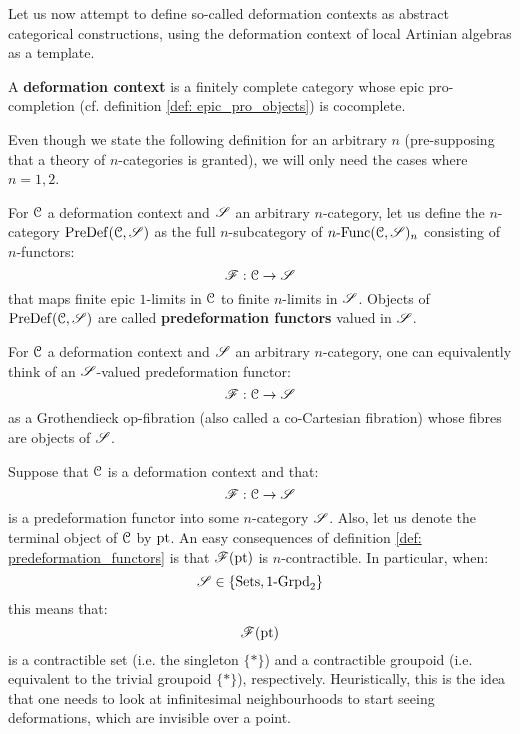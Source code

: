             Let us now attempt to define so-called deformation contexts as abstract categorical constructions, using the deformation context of local Artinian algebras as a template.
            \begin{definition} \label{def: deformation_context}
                A \textbf{deformation context} is a finitely complete category whose epic pro-completion (cf. definition \ref{def: epic_pro_objects}) is cocomplete. 
            \end{definition}
            Even though we state the following definition for an arbitrary $n$ (pre-supposing that a theory of $n$-categories is granted), we will only need the cases where $n = 1, 2$. 
            \begin{definition} \label{def: predeformation_functors}
                For $\mathcal{C}$ a deformation context and $\mathscr{S}$ an arbitrary $n$-category, let us define the $n$-category $\mathrm{Pre}\mathrm{Def}(\mathcal{C}, \mathscr{S})$ as the full $n$-subcategory of $n\text{-}\mathrm{Func}(\mathcal{C}, \mathscr{S})_n$ consisting of $n$-functors:
                    $$\mathscr{F}: \mathcal{C} \to \mathscr{S}$$
                that maps finite epic $1$-limits in $\mathcal{C}$ to finite $n$-limits in $\mathscr{S}$. Objects of $\mathrm{Pre}\mathrm{Def}(\mathcal{C}, \mathscr{S})$ are called \textbf{predeformation functors} valued in $\mathscr{S}$. 
            \end{definition}
            \begin{remark}
                For $\mathcal{C}$ a deformation context and $\mathscr{S}$ an arbitrary $n$-category, one can equivalently think of an $\mathscr{S}$-valued predeformation functor:
                    $$\mathscr{F}: \mathcal{C} \to \mathscr{S}$$
                as a Grothendieck op-fibration (also called a co-Cartesian fibration) whose fibres are objects of $\mathscr{S}$. 
            \end{remark}
            \begin{remark}
                Suppose that $\mathcal{C}$ is a deformation context and that:
                    $$\mathscr{F}: \mathcal{C} \to \mathscr{S}$$
                is a predeformation functor into some $n$-category $\mathscr{S}$. Also, let us denote the terminal object of $\mathcal{C}$ by $\mathrm{pt}$. An easy consequences of definition \ref{def: predeformation_functors} is that $\mathscr{F}(\mathrm{pt})$ is $n$-contractible. In particular, when:
                    $$\mathscr{S} \in \{\mathrm{Sets}, 1\text{-}\mathrm{Grpd}_2\}$$
                this means that:
                    $$\mathscr{F}(\mathrm{pt})$$
                is a contractible set (i.e. the singleton $\{*\}$) and a contractible groupoid (i.e. equivalent to the trivial groupoid $\{*\}$), respectively. Heuristically, this is the idea that one needs to look at infinitesimal neighbourhoods to start seeing deformations, which are invisible over a point.
            \end{remark}
